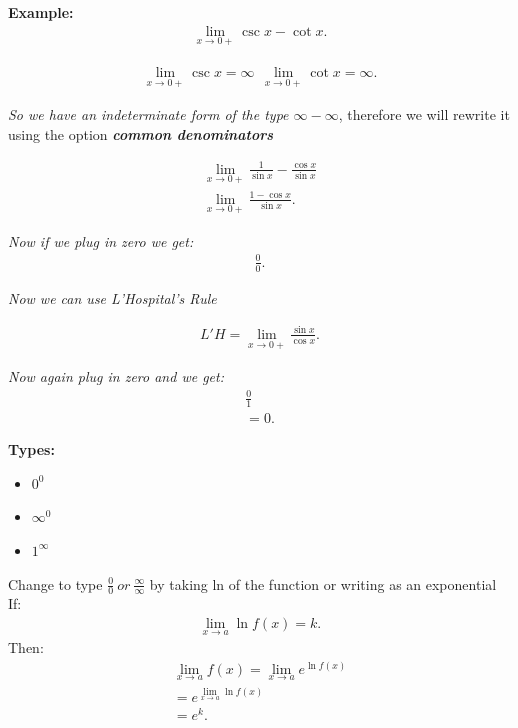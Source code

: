 \documentclass{report}
\begin{document}
  \bigbreak \noindent 
  \begin{mdframed}
    \textbf{Example:}
    \begin{align*}
      \lim_{x \to 0+}{\csc{x} - \cot{x}}
    .\end{align*}
  \end{mdframed}

  \begin{align*}
    \lim_{x \to 0+}{\csc{x}} = \infty\ \ \lim_{x \to 0+}{\cot{x}} = \infty
  .\end{align*}

  \bigbreak \noindent 
  \textit{So we have an indeterminate form of the type $\infty -\infty $}, therefore we will rewrite it 
  using the option \textbf{\textit{common denominators}}

  \begin{align*}
    \lim_{x \to 0+}{\frac{1}{\sin{x}} - \frac{\cos{x}}{\sin{x}}} \\
    \lim_{x \to 0+}{\frac{1-\cos{x}}{\sin{x}}}
  .\end{align*}
  \bigbreak \noindent

  \bigbreak \noindent 
  \textit{Now if we plug in zero we get:}
  \begin{align*}
    \frac{0}{0}
  .\end{align*}

  \bigbreak \noindent 
  \textit{Now we can use L'Hospital's Rule}

  \begin{align*}
    L'H = \lim_{x \to 0+}{\frac{\sin{x}}{\cos{x}}}
  .\end{align*}

  \bigbreak \noindent 
  \textit{Now again plug in zero and we get:}
  \begin{align*}
    \frac{0}{1} \\
    \boxed{=0}
  .\end{align*}

  \pagebreak \bigbreak \noindent
  \begin{mdframed}
    \textbf{Types:}
    \begin{itemize}
      \item $0^{0} $
      \item $\infty^{0} $
      \item $1^{\infty}$
    \end{itemize}
    \bigbreak \noindent 
    Change to type $\frac{0}{0}\ or\ \frac{\infty}{\infty}$ by taking ln of the function or writing as an exponential
    \bigbreak \noindent 
    If:
    \begin{align*}
      \lim_{x \to a}{\ln{f(x)} = k}
    .\end{align*}
    \bigbreak \noindent 
    Then:
    \begin{align*}
      \lim_{x \to a}{f(x)} = \lim_{x \to a}{e^{\ln{f(x)}}} \\
      = e^{ \lim_{x \to a}{\ln{f(x)}}} \\
      = e^{k}
    .\end{align*}
  \end{mdframed}
\end{document}
